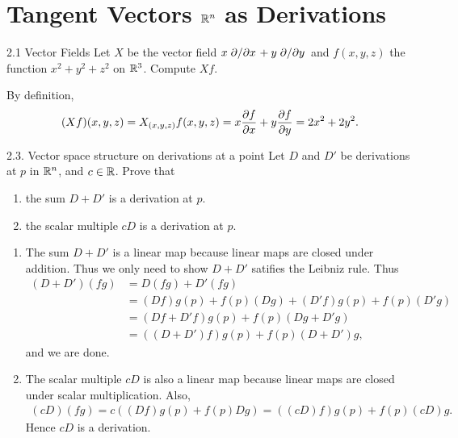 \section{Tangent Vectors $\mathbb{R}^n$ as Derivations}

\begin{problem}{2.1 Vector Fields}
    Let $X$ be the vector field $x\pdv*{x} + y\pdv*{y}$ and $f(x, y, z)$ the function $x^2 + y^2 + z^2$ on $\mathbb{R}^3$.
    Compute $Xf$.
\end{problem}

By definition, 
\begin{equation}
    (Xf)(x, y, z) = X_{(x, y, z)} f(x, y, z) = x \pdv{f}{x} (x, y, z) + y \pdv{f}{y} (x, y, z) = 2x^2 + 2y^2 .
\end{equation}

\begin{problem}{2.3. Vector space structure on derivations at a point}
    Let $D$ and $D'$ be derivations at $p$ in $\mathbb{R}^n$, and $c \in \mathbb{R}$. Prove that
\begin{enumerate}[label=(\alph*)]
    \item the sum $D + D'$ is a derivation at $p$.
    \item the scalar multiple $cD$ is a derivation at $p$.
\end{enumerate}
\end{problem}

\begin{enumerate}[label=(\alph*)]
    \item The sum $D + D'$ is a linear map because linear maps are closed under addition. 
    Thus we only need to show $D + D'$ satifies the Leibniz rule. Thus 
    \begin{align}
        (D + D')(fg) &= D(fg) + D'(fg) \\
        &= (Df) g(p) + f(p)(Dg) + (D'f) g(p) + f(p) (D'g) \\ 
        &= (Df + D'f)g(p) + f(p)(Dg + D'g) \\ 
        &= ( (D + D')f ) g(p) + f(p) (D + D')g,
    \end{align}
    and we are done.

    \item The scalar multiple $cD$ is also a linear map because linear maps are closed under scalar 
    multiplication. Also,
    \begin{align}
        (cD)(fg) = c((Df)g(p) + f(p)Dg) = ((cD)f) g(p) + f(p) (cD)g .
    \end{align}
    Hence $cD$ is a derivation.
\end{enumerate}

